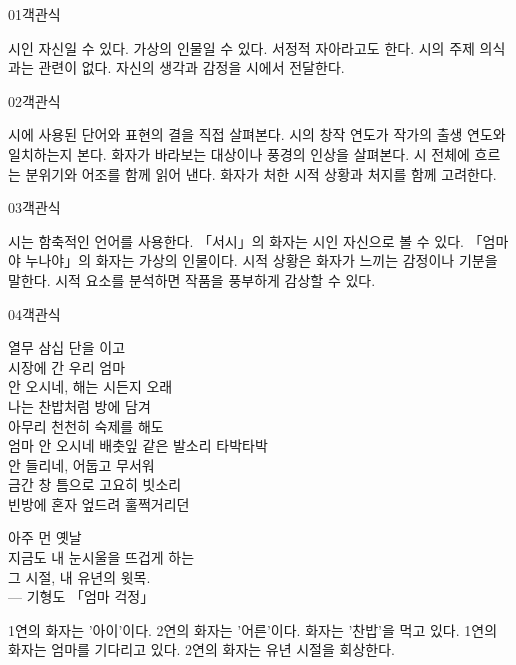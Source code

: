 \documentclass[fs9,seriesRus]{korfarm-base}
\begin{document}

\par\medskip
\kfBeginMC
\begin{kfQBlock}{01}{객관식}
\begin{kfChoices}
\kfChoice 시인 자신일 수 있다.
\kfChoice 가상의 인물일 수 있다.
\kfChoice 서정적 자아라고도 한다.
\kfChoice 시의 주제 의식과는 관련이 없다.
\kfChoice 자신의 생각과 감정을 시에서 전달한다.
\end{kfChoices}
\end{kfQBlock}
\begin{kfQBlock}{02}{객관식}
\begin{kfChoices}
\kfChoice 시에 사용된 단어와 표현의 결을 직접 살펴본다.
\kfChoice 시의 창작 연도가 작가의 출생 연도와 일치하는지 본다.
\kfChoice 화자가 바라보는 대상이나 풍경의 인상을 살펴본다.
\kfChoice 시 전체에 흐르는 분위기와 어조를 함께 읽어 낸다.
\kfChoice 화자가 처한 시적 상황과 처지를 함께 고려한다.
\end{kfChoices}
\end{kfQBlock}
\begin{kfQBlock}{03}{객관식}
\begin{kfChoices}
\kfChoice 시는 함축적인 언어를 사용한다.
\kfChoice 「서시」의 화자는 시인 자신으로 볼 수 있다.
\kfChoice 「엄마야 누나야」의 화자는 가상의 인물이다.
\kfChoice 시적 상황은 화자가 느끼는 감정이나 기분을 말한다.
\kfChoice 시적 요소를 분석하면 작품을 풍부하게 감상할 수 있다.
\end{kfChoices}
\end{kfQBlock}
\begin{kfQBlock}{04}{객관식}
\begin{kfEvidence}열무 삼십 단을 이고 \\\relax
시장에 간 우리 엄마 \\\relax
안 오시네, 해는 시든지 오래 \\\relax
나는 찬밥처럼 방에 담겨 \\\relax
아무리 천천히 숙제를 해도 \\\relax
엄마 안 오시네 배춧잎 같은 발소리 타박타박 \\\relax
안 들리네, 어둡고 무서워 \\\relax
금간 창 틈으로 고요히 빗소리 \\\relax
빈방에 혼자 엎드려 훌쩍거리던

아주 먼 옛날 \\\relax
지금도 내 눈시울을 뜨겁게 하는 \\\relax
그 시절, 내 유년의 윗목. \\\relax
— 기형도 「엄마 걱정」\end{kfEvidence}
\begin{kfChoices}
\kfChoice 1연의 화자는 '아이'이다.
\kfChoice 2연의 화자는 '어른'이다.
\kfChoice 화자는 '찬밥'을 먹고 있다.
\kfChoice 1연의 화자는 엄마를 기다리고 있다.
\kfChoice 2연의 화자는 유년 시절을 회상한다.
\end{kfChoices}
\end{kfQBlock}
\end{document}
